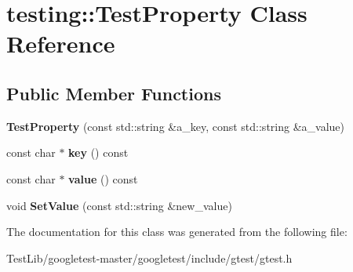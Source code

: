 \hypertarget{classtesting_1_1TestProperty}{}\section{testing\+:\+:Test\+Property Class Reference}
\label{classtesting_1_1TestProperty}
\subsection*{Public Member Functions}
\begin{DoxyCompactItemize}
\item 
\mbox{\label{classtesting_1_1TestProperty_a25a0ccf1c75a92af46a48d3c2a873e6d}} 
{\bfseries Test\+Property} (const std\+::string \&a\+\_\+key, const std\+::string \&a\+\_\+value)
\item 
\mbox{\label{classtesting_1_1TestProperty_ad60435d4ad04ac030487d8998fc61c5f}} 
const char $\ast$ {\bfseries key} () const
\item 
\mbox{\label{classtesting_1_1TestProperty_ad423a07af33c88b0c9ed33ee74815a63}} 
const char $\ast$ {\bfseries value} () const
\item 
\mbox{\label{classtesting_1_1TestProperty_a377245335d9f614cd06d1650e3358e1d}} 
void {\bfseries Set\+Value} (const std\+::string \&new\+\_\+value)
\end{DoxyCompactItemize}


The documentation for this class was generated from the following file\+:\begin{DoxyCompactItemize}
\item 
Test\+Lib/googletest-\/master/googletest/include/gtest/gtest.\+h\end{DoxyCompactItemize}
